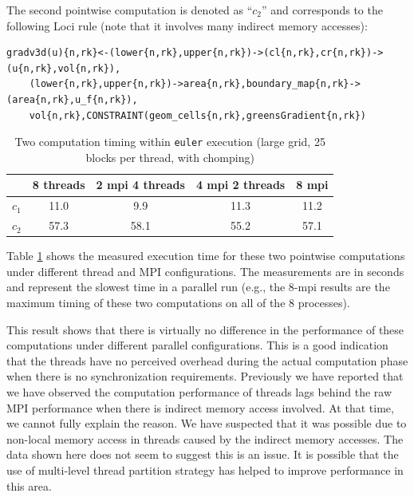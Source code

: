 \documentclass{article}
\begin{document}
The second pointwise computation is denoted as ``$c_2$'' and corresponds
to the following Loci rule (note that it involves many indirect memory
accesses):
\begin{verbatim}
gradv3d(u){n,rk}<-(lower{n,rk},upper{n,rk})->(cl{n,rk},cr{n,rk})->(u{n,rk},vol{n,rk}),
    (lower{n,rk},upper{n,rk})->area{n,rk},boundary_map{n,rk}->(area{n,rk},u_f{n,rk}),
    vol{n,rk},CONSTRAINT(geom_cells{n,rk},greensGradient{n,rk})
\end{verbatim}

\begin{table}[h]
  \begin{center}
    \caption{Two computation timing within \texttt{euler} execution (large grid, 25 blocks per thread, with chomping)\label{tab:euler-rule-time}}
    \begin{tabular}{|l|c|c|c|c|}
      \hline
      & 8 threads & 2 mpi 4 threads & 4 mpi 2 threads & 8 mpi\\
      \hline
       $c_1$ & 11.0 & 9.9 & 11.3 & 11.2\\ 
       $c_2$ & 57.3 & 58.1 & 55.2 & 57.1\\
      \hline
    \end{tabular}
  \end{center}
\end{table}

Table \ref{tab:euler-rule-time} shows the measured execution time for
these two pointwise computations under different thread and MPI
configurations.  The measurements are in seconds and represent the
slowest time in a parallel run (e.g., the 8-mpi results are the maximum
timing of these two computations on all of the 8 processes).

This result shows that there is virtually no difference in the
performance of these computations under different parallel
configurations.  This is a good indication that the threads have no
perceived overhead during the actual computation phase when there is no
synchronization requirements.  Previously we have reported that we have
observed the computation performance of threads lags behind the raw MPI
performance when there is indirect memory access involved.  At that
time, we cannot fully explain the reason.  We have suspected that it was
possible due to non-local memory access in threads caused by the
indirect memory accesses.  The data shown here does not seem to suggest
this is an issue.  It is possible that the use of multi-level thread
partition strategy has helped to improve performance in this area.
\end{document}
